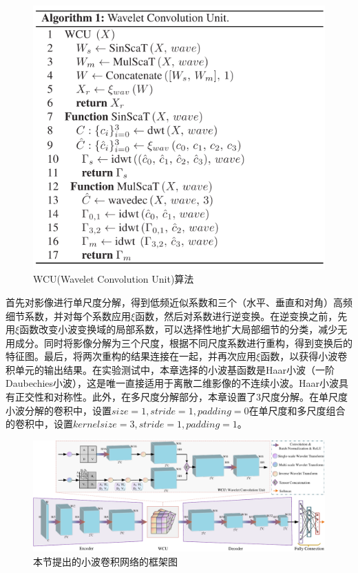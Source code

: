     \begin{figure}
      \centering
      \includegraphics[width=0.75\linewidth]{figs/paper3Algorithm1WCU.png}
      \caption{WCU(Wavelet Convolution Unit)算法}\label{paper3algorithmWCU}
    \end{figure}
\fi
首先对影像进行单尺度分解，得到低频近似系数和三个（水平、垂直和对角）高频细节系数，并对每个系数应用$\xi$函数，然后对系数进行逆变换。在逆变换之前，先用$\xi$函数改变小波变换域的局部系数，可以选择性地扩大局部细节的分类，减少无用成分。同时将影像分解为三个尺度，根据不同尺度系数进行重构，得到变换后的特征图。最后，将两次重构的结果连接在一起，并再次应用$\xi$函数，以获得小波卷积单元的输出结果。在实验测试中，本章选择的小波基函数是Haar小波（一阶Daubechies小波），这是唯一直接适用于离散二维影像的不连续小波。Haar小波具有正交性和对称性。此外，在多尺度分解部分，本章设置了3尺度分解。在单尺度小波分解的卷积中，设置$size=1, stride=1, padding=0$在单尺度和多尺度组合的卷积中，设置$kernel size=3, stride=1, padding=1$。
    
    \begin{figure}[t]
      \centering
      \includegraphics[width=0.9\linewidth]{figs/paper3framework.pdf}
      \caption{本节提出的小波卷积网络的框架图}\label{paper3framework}
    \end{figure}


